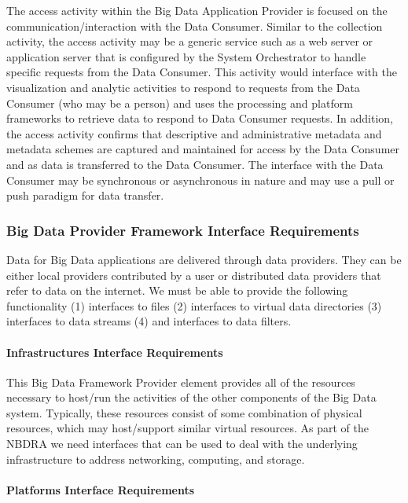 \documentclass[10pt]{article}
\begin{document}
The access activity within the Big Data Application Provider is
focused on the communication/interaction with the Data Consumer.
Similar to the collection activity, the access activity may be a
generic service such as a web server or application server that is
configured by the System Orchestrator to handle specific requests from
the Data Consumer. This activity would interface with the
visualization and analytic activities to respond to requests from the
Data Consumer (who may be a person) and uses the processing and
platform frameworks to retrieve data to respond to Data Consumer
requests. In addition, the access activity confirms that descriptive
and administrative metadata and metadata schemes are captured and
maintained for access by the Data Consumer and as data is transferred
to the Data Consumer. The interface with the Data Consumer may be
synchronous or asynchronous in nature and may use a pull or push
paradigm for data transfer.

\subsubsection{Big Data Provider Framework Interface Requirements}\label{S:r-provider-interface}

Data for Big Data applications are delivered through data providers.
They can be either local providers contributed by a user or
distributed data providers that refer to data on the internet. We must
be able to provide the following functionality (1) interfaces to files
(2) interfaces to virtual data directories (3) interfaces to data
streams (4) and interfaces to data filters.

\paragraph{Infrastructures Interface Requirements}

This Big Data Framework Provider element provides all of the resources
necessary to host/run the activities of the other components of the
Big Data system. Typically, these resources consist of some
combination of physical resources, which may host/support similar
virtual resources. As part of the NBDRA we need interfaces that can be
used to deal with the underlying infrastructure to address networking,
computing, and storage.

\paragraph{Platforms Interface Requirements}
\end{document}
